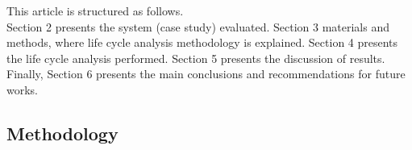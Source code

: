 \documentclass[]{elsarticle} %
\begin{document}
This article is structured as follows.\\
Section 2 presents the system (case study) evaluated.
Section 3 materials and methods, where life cycle analysis methodology is explained. Section 4 presents the life cycle analysis performed. Section 5 presents the discussion of results.
Finally, Section 6 presents the main conclusions and recommendations for future works.

\hypertarget{methodology}{%
\subsection{Methodology}\label{methodology}}


\end{document}

